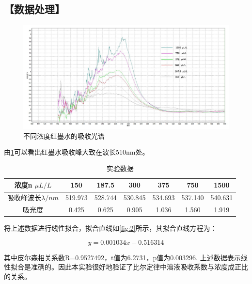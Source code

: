 \documentclass[12pt,a4paper,UTF8]{ctexart}
\begin{document}
\newpage
\subsection*{【数据处理】}

\begin{figure}[htbp]
	\centering
	\includegraphics[width=\textwidth]{img//吸收光谱.jpg}
	\caption{不同浓度红墨水的吸收光谱}
	\label{fig:1}
\end{figure}

由\ref{fig:1}可以看出红墨水吸收峰大致在波长510nm处。


\begin{table}[htbp]
	\caption{实验数据}
	\centering
    \begin{tabular}{|c|c|c|c|c|c|c|}
	\hline
    浓度n $\mu L/L $   & 150 & 187.5 & 300 & 375 & 750 & 1500 \\
	\hline
    吸收峰波长$\lambda /nm$ & 519.973 & 528.744 & 530.845 & 534.693 & 537.140 & 540.631 \\
	\hline
    吸光度 & 0.425 & 0.625 & 0.905 & 1.036 & 1.560 & 1.919 \\
	\hline
	\end{tabular}%
	\label{tab:data}%
\end{table}%
将上述数据进行线性拟合，拟合直线如\ref{fig:2}所示，其拟合直线方程为：

\begin{equation*}
	y=0.001034x+0.516314
\end{equation*}

其中皮尔森相关系数R=0.9527492，t值为6.2731，p值为0.003296.
上述数据表示线性拟合是准确的。因此本实验很好地验证了比尔定律中溶液吸收系数与浓度成正比的关系。
\end{document}
